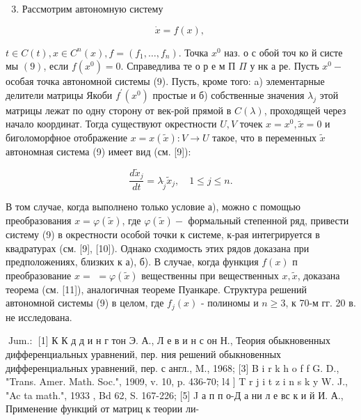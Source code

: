 \documentclass[10pt]{article}
\begin{document}
\begin{enumerate}

  \setcounter{enumi}{2}

  \item Рассмотрим автономную систему

\end{enumerate}



\[

\dot{x}=f(x) \text {, }

\]



$t \in C(t), x \in C^{n}(x), f=\left(f_{1}, \ldots, f_{n}\right)$. Точка $x^{0}$ наз. о с обой точ ко й систе мы $(9)$, если $f\left(x^{0}\right)=0$. Справедлива те о р е м П $\Pi$ у нк а ре. Пусть $x^{0}-$ особая точка автономной системы (9). Пусть, кроме того: a) элементарные делители матрицы Якоби $f^{\prime}\left(x^{0}\right)$ простые и б) собственные значения $\lambda_{j}$ этой матрицы лежат по одну сторону от век-рой прямой в $C(\lambda)$, проходящей через начало координат. Тогда существуют окрестности $U, V$ точек $x=x^{0}, \tilde{x}=0$ и биголоморфное отображение $x=x(\tilde{x}): V \rightarrow U$ такое, что в переменных $\tilde{x}$ автономная система (9) имеет вид (см. [9]):



\[

\frac{d \tilde{x}_{j}}{d t}=\lambda_{\tilde{j}} \tilde{x}_{j}, \quad 1 \leqslant j \leqslant n .

\]



В том случае, когда выполнено только условие а), можно с помощью преобразования $x=\varphi(\tilde{x})$, где $\varphi(\tilde{x})-$ формальный степенной ряд, привести систему (9) в окрестности особой точки к системе, к-рая интегрируется в квадратурах (см. [9], [10]). Однако сходимость этих рядов доказана при предположениях, близких к а), б). В случае, когда функция $f(x)$ п преобразование $x=$ $=\varphi(\tilde{x})$ вещественны при вещественных $x, \tilde{x}$, доказана теорема (см. [11]), аналогичная теореме Пуанкаре. Структура решений автономной системы (9) в целом, где $f_{j}(x)$ - полиномы и $n \geqslant 3$, к 70-м гг. 20 в. не исследована.



$\operatorname{Jum.:}$ [1] К К д д и н г тон Э. А., Л е в и н с он Н., Теория обыкновенных дифференциальных уравнений, пер. ния решений обыкновенных дифференциальных уравнений, пер. с англ., M., 1968; [3] B i r k h o f f G. D., "Trans. Amer. Math. Soc.", 1909, v. 10, p. 436-70; l4 ] T r j i t z i n s k y W. J., "Ac ta math.", 1933 , Bd 62, S. 167-226; [5] J а п п о-Д а ни л е вс к и й И. А., Применение функций от матриц к теории ли-
\end{document}
